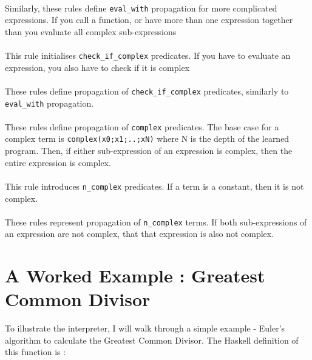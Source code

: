 
\mbox{} \\
Similarly, these rules define \lstinline{eval_with} propagation for more complicated expressions. If you call a function, or have more than one expression together than you evaluate all complex sub-expressions \\ %


\mbox{} \\
This rule initialises \lstinline{check_if_complex} predicates. If you have to evaluate an expression, you also have to check if it is complex \\%


\mbox{} \\
These rules define propagation of \lstinline{check_if_complex} predicates, similarly to \lstinline{eval_with} propagation. \\


\mbox{} \\
These rules define propagation of \lstinline{complex} predicates. The base case for a complex term is \lstinline{complex(x0;x1;..;xN)} where N is the depth of the learned program. Then, if either sub-expression of an expression is complex, then the entire expression is complex. \\


\mbox{} \\
This rule introduces \lstinline{n_complex} predicates. If a term is a constant, then it is not complex. \\ %


\mbox{} \\
These rules represent propagation of \lstinline{n_complex} terms. If both sub-expressions of an expression are not complex, that that expression is also not complex. \\ %

\section{A Worked Example : Greatest Common Divisor}

To illustrate the interpreter, I will walk through a simple example - Euler's algorithm to calculate the Greatest Common Divisor. The Haskell definition of this function is :


